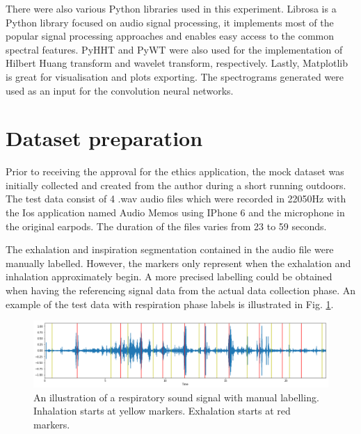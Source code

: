 There were also various Python libraries used in this experiment. Librosa is a Python library focused on audio signal processing, it implements most of the popular signal processing approaches and enables easy access to the common spectral features. PyHHT and PyWT were also used for the implementation of Hilbert Huang transform and wavelet transform, respectively. Lastly, Matplotlib is great for visualisation and plots exporting. The spectrograms generated were used as an input for the convolution neural networks.

\section{Dataset preparation}
Prior to receiving the approval for the ethics application, the mock dataset was initially collected and created from the author during a short running outdoors. The test data consist of 4 .wav audio files which were recorded in 22050Hz with the Ios application named Audio Memos using IPhone 6 and the microphone in the original earpods. The duration of the files varies from 23 to 59 seconds.

The exhalation and inspiration segmentation contained in the audio file were manually labelled. However, the markers only represent when the exhalation and inhalation approximately begin. A more precised labelling could be obtained when having the referencing signal data from the actual data collection phase. An example of the test data with respiration phase labels is illustrated in Fig. \ref{fig:audio_waveform}.

\begin{figure}[h]
    \centerline{\includegraphics[scale=0.35]{figures/audio_waveform.png}}
    \caption{An illustration of a respiratory sound signal with manual labelling. Inhalation starts at yellow markers. Exhalation starts at red markers.}
    \label{fig:audio_waveform}
\end{figure}

\clearpage

